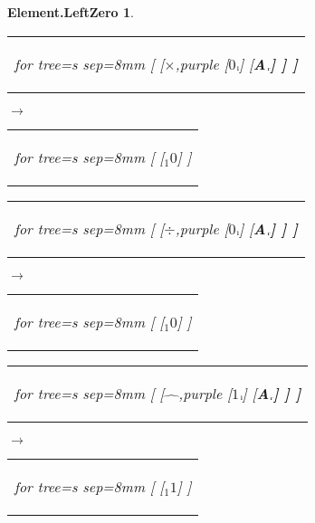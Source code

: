 \documentclass[UTF8,10pt]{ctexart}
\newcommand{\Bigskip}{\bigskip\medskip}
\newcommand{\subtreeA}{\bf A}
\newcommand{\I}{$_{\scriptscriptstyle 1}$}
\newcommand{\lc}{$_{\:\!\scriptscriptstyle\rm l\!}$}
\newcommand{\rc}{$_{\:\!\scriptscriptstyle\rm r\!}$}
\newcommand{\Zero}{$0$}
\newcommand{\One}{$1$}
\newcommand{\Multiplication}{$\times$}
\newcommand{\Division}{$\div$}
\newcommand{\Power}{$\hat{\quad}$}
\newtheorem*{Element.LeftZero}{\bf Element.LeftZero }
\begin{document}
	\begin{center}\vspace*{\fill}
		\begin{Element.LeftZero}
			\qquad\par\Bigskip
			\begin{tabular}{c}
				\begin{forest}
					for tree={s sep=8mm}
					[
						[\Multiplication,purple
							[\Zero\lc]
							[\subtreeA\rc]
						]
					]
				\end{forest}
			\end{tabular}
			\qquad
			$\longrightarrow$
			\qquad
			\begin{tabular}{c}
				\begin{forest}
					for tree={s sep=8mm}
					[
						[\I\Zero]
					]
				\end{forest}
			\end{tabular}
			\par\bigskip
			\begin{tabular}{c}
				\begin{forest}
					for tree={s sep=8mm}
					[
						[\Division,purple
							[\Zero\lc]
							[\subtreeA\rc]
						]
					]
				\end{forest}
			\end{tabular}
			\qquad
			$\longrightarrow$
			\qquad
			\begin{tabular}{c}
				\begin{forest}
					for tree={s sep=8mm}
					[
						[\I\Zero]
					]
				\end{forest}
			\end{tabular}
			\par\bigskip
			\begin{tabular}{c}
				\begin{forest}
					for tree={s sep=8mm}
					[
						[\Power,purple
							[\One\lc]
							[\subtreeA\rc]
						]
					]
				\end{forest}
			\end{tabular}
			\qquad
			$\longrightarrow$
			\qquad
			\begin{tabular}{c}
				\begin{forest}
					for tree={s sep=8mm}
					[
						[\I\One]
					]
				\end{forest}
			\end{tabular}
		\end{Element.LeftZero}
	\vspace*{\fill}\end{center}
\end{document}
